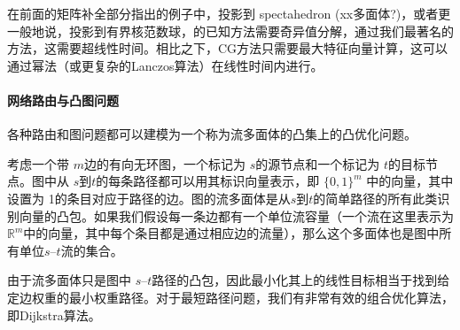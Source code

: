 在前面的矩阵补全部分指出的例子中，投影到 spectahedron (xx多面体?)，或者更一般地说，投影到有界核范数球，的已知方法需要奇异值分解，通过我们最著名的方法，这需要超线性时间。相比之下，CG方法只需要最大特征向量计算，这可以通过幂法（或更复杂的Lanczos算法）在线性时间内进行。

\paragraph*{
    网络路由与凸图问题
    }

各种路由和图问题都可以建模为一个称为流多面体的凸集上的凸优化问题。

考虑一个带 $m$边的有向无环图，一个标记为 $s$的源节点和一个标记为 $t$的目标节点。图中从 $s$到$t$的每条路径都可以用其标识向量表示，即 $\lbrace{0,1}\rbrace^m$ 中的向量，其中设置为 1的条目对应于路径的边。图的流多面体是从$s$到$t$的简单路径的所有此类识别向量的凸包。如果我们假设每一条边都有一个单位流容量（一个流在这里表示为 $\mathbb{R}^m$中的向量，其中每个条目都是通过相应边的流量），那么这个多面体也是图中所有单位$s$--$t$流的集合。

由于流多面体只是图中 $s$--$t$路径的凸包，因此最小化其上的线性目标相当于找到给定边权重的最小权重路径。对于最短路径问题，我们有非常有效的组合优化算法，即Dijkstra算法。

